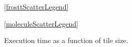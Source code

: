 \begin{figure}[h]
    \ref{frosttScatterLegend}
    \centering
    

    \ref{moleculeScatterLegend}
    
        \caption{Execution time as a function of tile size.}
    \label{fig::scatter}
\end{figure}
